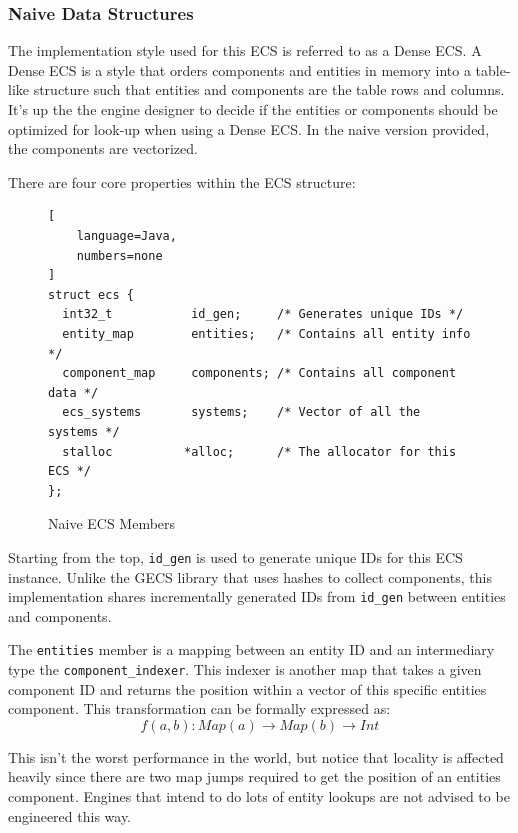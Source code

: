\subsubsection{Naive Data Structures}
The implementation style used for this ECS is referred to as a Dense ECS. \cite{EnTT_SparseSets} A Dense ECS is a style that orders components and entities in memory into a table-like structure such that entities and components are the table rows and columns. It's up the the engine designer to decide if the entities or components should be optimized for look-up when using a Dense ECS. In the naive version provided, the components are vectorized.

There are four core properties within the ECS structure:

\begin{figure}[H]
\begin{lstlisting}[
    language=Java,
    numbers=none
]
struct ecs {
  int32_t           id_gen;     /* Generates unique IDs */
  entity_map        entities;   /* Contains all entity info */
  component_map     components; /* Contains all component data */
  ecs_systems       systems;    /* Vector of all the systems */
  stalloc          *alloc;      /* The allocator for this ECS */
};
\end{lstlisting}
    \caption{Naive ECS Members}
    \label{code:naive_ecs_data}
\end{figure}

Starting from the top, \texttt{id\_gen} is used to generate unique IDs for this ECS instance. Unlike the GECS library that uses hashes to collect components, this implementation shares incrementally generated IDs from \texttt{id\_gen} between entities and components.

The \texttt{entities} member is a mapping between an entity ID and an intermediary type the \texttt{component\_indexer}. This indexer is another map that takes a given component ID and returns the position within a vector of this specific entities component. This transformation can be formally expressed as:
\begin{equation*}
    f(a, b) : Map(a) \rightarrow Map(b) \rightarrow Int
\end{equation*}

This isn't the worst performance in the world, but notice that locality is affected heavily since there are two map jumps required to get the position of an entities component. Engines that intend to do lots of entity lookups are not advised to be engineered this way. 

